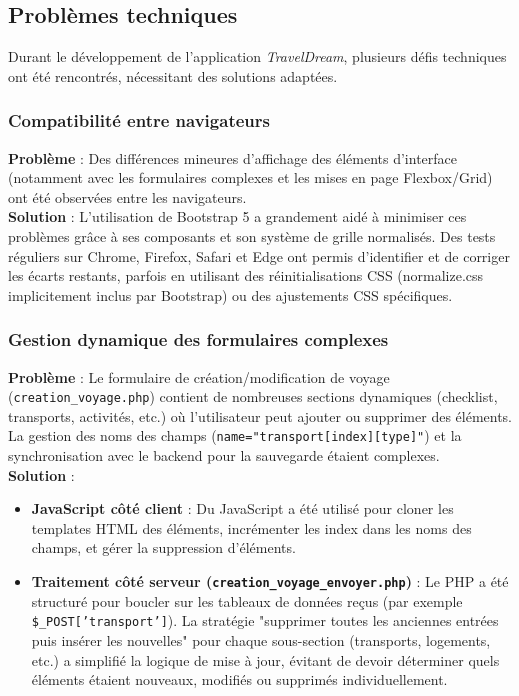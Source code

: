 \documentclass[a4paper,12pt]{article}
\begin{document}
\subsection{Problèmes techniques}
Durant le développement de l’application \textit{TravelDream}, plusieurs défis techniques ont été rencontrés, nécessitant des solutions adaptées.

\subsubsection{Compatibilité entre navigateurs}
\textbf{Problème} : Des différences mineures d'affichage des éléments d'interface (notamment avec les formulaires complexes et les mises en page Flexbox/Grid) ont été observées entre les navigateurs. \\
\textbf{Solution} : L'utilisation de Bootstrap 5 a grandement aidé à minimiser ces problèmes grâce à ses composants et son système de grille normalisés. Des tests réguliers sur Chrome, Firefox, Safari et Edge ont permis d'identifier et de corriger les écarts restants, parfois en utilisant des réinitialisations CSS (normalize.css implicitement inclus par Bootstrap) ou des ajustements CSS spécifiques.

\subsubsection{Gestion dynamique des formulaires complexes}
\textbf{Problème} : Le formulaire de création/modification de voyage (\texttt{creation\_voyage.php}) contient de nombreuses sections dynamiques (checklist, transports, activités, etc.) où l'utilisateur peut ajouter ou supprimer des éléments. La gestion des noms des champs (\texttt{name="transport[index][type]"}) et la synchronisation avec le backend pour la sauvegarde étaient complexes. \\
\textbf{Solution} :
\begin{itemize}
    \item \textbf{JavaScript côté client} : Du JavaScript a été utilisé pour cloner les templates HTML des éléments, incrémenter les index dans les noms des champs, et gérer la suppression d'éléments.
    \item \textbf{Traitement côté serveur (\texttt{creation\_voyage\_envoyer.php})} : Le PHP a été structuré pour boucler sur les tableaux de données reçus (par exemple \texttt{\$\_POST['transport']}). La stratégie "supprimer toutes les anciennes entrées puis insérer les nouvelles" pour chaque sous-section (transports, logements, etc.) a simplifié la logique de mise à jour, évitant de devoir déterminer quels éléments étaient nouveaux, modifiés ou supprimés individuellement.
\end{itemize}
\end{document}
